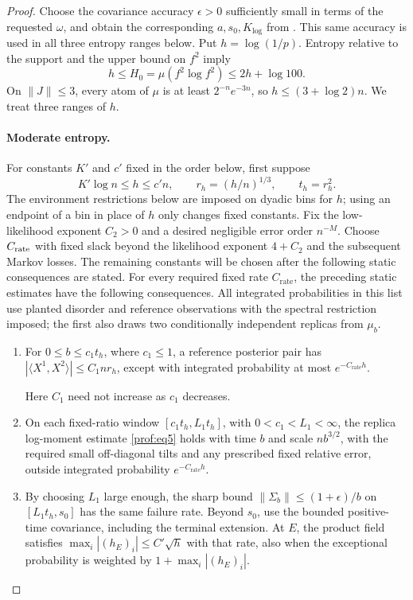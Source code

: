 \begin{proof}
Choose the covariance accuracy \(\epsilon>0\) sufficiently small
in terms of the requested \(\omega\), and obtain the corresponding
\(a,s_0,K_{\log}\) from .
This same accuracy is used in all three entropy ranges below.
Put $h=\log(1/p)$.  Entropy relative to the support and the upper bound on
$f^2$ imply
\begin{equation}
 h\le H_0=\mu(f^2\log f^2)\le2h+\log100.
 \label{prof:initial-entropy}
\end{equation}
On $\|J\|\le3$, every atom of $\mu$ is at least
$2^{-n}e^{-3n}$, so $h\le(3+\log2)n$.  We treat three ranges of $h$.

\paragraph{Moderate entropy.}
For constants \(K'\) and \(c'\) fixed in the order below, first suppose
\[
 K'\log n\le h\le c'n,
 \qquad r_h=(h/n)^{1/3},\qquad t_h=r_h^2.
\]
The environment restrictions below are imposed on dyadic bins for $h$;
using an endpoint of a bin in place of $h$ only changes fixed constants.
Fix the low-likelihood exponent \(C_2>0\) and a desired negligible
error order \(n^{-M}\). Choose \(C_{\rm rate}\) with fixed slack
beyond the likelihood exponent \(4+C_2\) and the subsequent
Markov losses. The remaining constants will be chosen after the
following static consequences are stated.
For every required fixed rate $C_{\mathrm{rate}}$, the preceding static
estimates have the following consequences. All integrated probabilities
in this list use planted disorder and reference observations with
the spectral restriction imposed; the first also draws two
conditionally independent replicas from \(\mu_b\).
\begin{enumerate}
\item For $0\le b\le c_1t_h$, where $c_1\le1$, a reference posterior pair
has $|\langle X^1,X^2\rangle|\le C_1nr_h$, except with integrated
probability at most $e^{-C_{\mathrm{rate}}h}$.

Here $C_1$ need not increase
as $c_1$ decreases.
\item On each fixed-ratio window $[c_1t_h,L_1t_h]$, with
$0<c_1<L_1<\infty$, the replica log-moment estimate
\eqref{prof:eq5} holds with time $b$ and scale $nb^{3/2}$, with the required
small off-diagonal tilts and any prescribed fixed relative error, outside
integrated probability $e^{-C_{\mathrm{rate}}h}$.
\item By choosing $L_1$ large enough, the sharp bound
$\|\Sigma_b\|\le(1+\epsilon)/b$ on $[L_1t_h,s_0]$ has the same failure
rate.  Beyond $s_0$, use the bounded positive-time covariance, including the
terminal extension.  At $E$, the product field satisfies
$\max_i|(h_E)_i|\le C'\sqrt h$ with that rate, also when the exceptional
probability is weighted by $1+\max_i|(h_E)_i|$.
\end{enumerate}


\end{proof}
